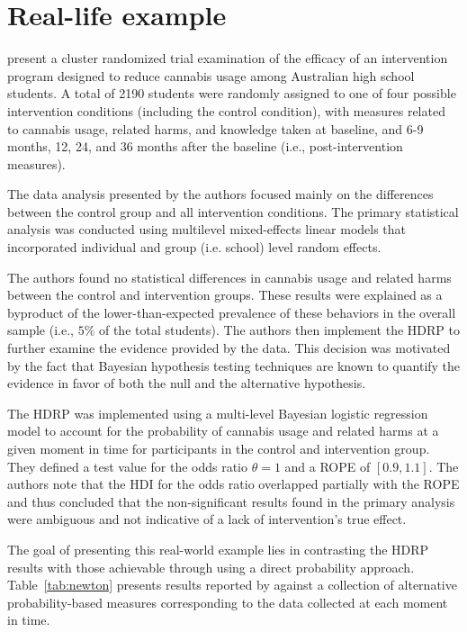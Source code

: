 \documentclass[man]{apa}
\newcommand{\hdr}{HDRP}
\begin{document}
 \section*{Real-life example}

 present a cluster randomized trial examination of the efficacy of an intervention program designed to reduce cannabis usage among Australian high school students. A total of 2190 students were randomly assigned to one of four possible intervention conditions (including the control condition), with measures related to cannabis usage, related harms, and knowledge taken at baseline, and 6-9 months, 12, 24, and 36 months after the baseline (i.e., post-intervention measures). 

The data analysis presented by the authors focused mainly on the differences between the control group and all intervention conditions. The primary statistical analysis was conducted using multilevel mixed-effects linear models that incorporated individual and group (i.e. school) level random effects. 

The authors found no statistical differences in cannabis usage and related harms between the control and intervention groups. These results were explained as a byproduct of the lower-than-expected prevalence of these behaviors in the overall sample (i.e., $5\%$ of the total students). The authors then implement the \hdr{} to further examine the evidence provided by the data. This decision was motivated by the fact that Bayesian hypothesis testing techniques are known to quantify the evidence in favor of both the null and the alternative hypothesis. 

The \hdr{} was implemented using a multi-level Bayesian logistic regression model to account for the probability of cannabis usage and related harms at a given moment in time for participants in the control and intervention group. They defined a test value for the odds ratio $\theta=1$ and a ROPE of $[0.9,1.1]$. The authors note that the HDI for the odds ratio overlapped partially with the ROPE and thus concluded that the non-significant results found in the primary analysis were ambiguous and not indicative of a lack of intervention's true effect.

The goal of presenting this real-world example lies in contrasting the \hdr{} results with those achievable through using a direct probability approach. Table~\ref{tab:newton} presents results reported by  against a collection of alternative probability-based measures corresponding to the data collected at each moment in time. 
\end{document}
